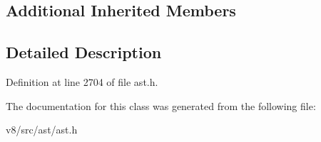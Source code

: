 \subsection*{Additional Inherited Members}


\subsection{Detailed Description}


Definition at line 2704 of file ast.\+h.



The documentation for this class was generated from the following file\+:\begin{DoxyCompactItemize}
\item 
v8/src/ast/ast.\+h\end{DoxyCompactItemize}
